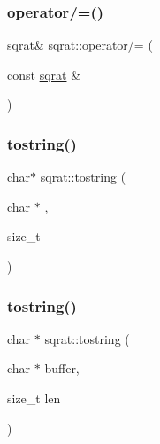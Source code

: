 \mbox{\label{classsqrat_a348781af63f0a423ad0a84342fdccb49}} 
\subsubsection{\texorpdfstring{operator/=()}{operator/=()}\hspace{0.1cm}{\footnotesize\ttfamily [3/3]}}
{\footnotesize\ttfamily \mbox{\hyperlink{classsqrat}{sqrat}}\& sqrat\+::operator/= (\begin{DoxyParamCaption}\item[{const \mbox{\hyperlink{classsqrat}{sqrat}} \&}]{ }\end{DoxyParamCaption})}

\mbox{\label{classsqrat_a0e94b27cf419cf8888da52e854f9d60b}} 
\subsubsection{\texorpdfstring{tostring()}{tostring()}\hspace{0.1cm}{\footnotesize\ttfamily [1/3]}}
{\footnotesize\ttfamily char$\ast$ sqrat\+::tostring (\begin{DoxyParamCaption}\item[{char $\ast$}]{,  }\item[{size\+\_\+t}]{ }\end{DoxyParamCaption})}

\mbox{\label{classsqrat_a001bc36694a9213a62c22c8d8bebbec2}} 
\subsubsection{\texorpdfstring{tostring()}{tostring()}\hspace{0.1cm}{\footnotesize\ttfamily [2/3]}}
{\footnotesize\ttfamily char $\ast$ sqrat\+::tostring (\begin{DoxyParamCaption}\item[{char $\ast$}]{buffer,  }\item[{size\+\_\+t}]{len }\end{DoxyParamCaption})}

\mbox{\label{classsqrat_a0e94b27cf419cf8888da52e854f9d60b}} 

